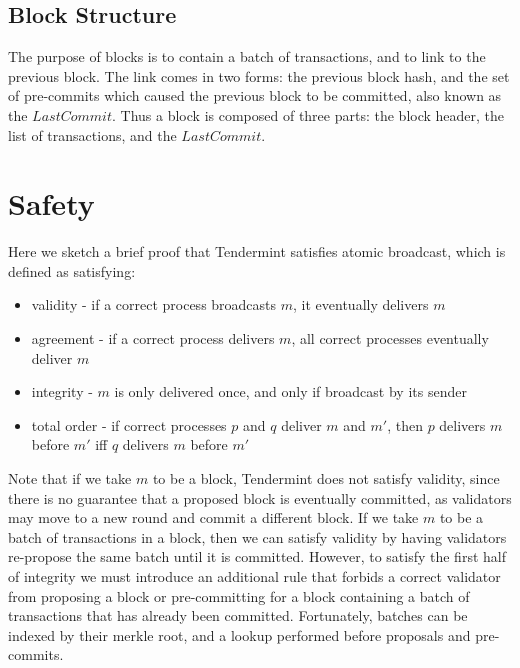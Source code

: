 \subsection{Block Structure}

The purpose of blocks is to contain a batch of transactions, and to link to the previous block.
The link comes in two forms: the previous block hash,
and the set of pre-commits which caused the previous block to be committed, also known as the $LastCommit$.
Thus a block is composed of three parts: the block header, the list of transactions, and the $LastCommit$.

\section{Safety}

Here we sketch a brief proof that Tendermint satisfies atomic broadcast,
which is defined as satisfying:

\begin{itemize}
\item validity - if a correct process broadcasts $m$, it eventually delivers $m$
\item agreement - if a correct process delivers $m$, all correct processes eventually deliver $m$
\item integrity - $m$ is only delivered once, and only if broadcast by its sender
\item total order - if correct processes $p$ and $q$ deliver $m$ and $m'$, then $p$ delivers $m$ before $m'$ iff $q$ delivers $m$ before $m'$
\end{itemize}

Note that if we take $m$ to be a block,
Tendermint does not satisfy validity,
since there is no guarantee that a proposed block is eventually committed, 
as validators may move to a new round and commit a different block.
If we take $m$ to be a batch of transactions in a block, 
then we can satisfy validity by having validators re-propose the same batch until it is committed.
However, to satisfy the first half of integrity 
we must introduce an additional rule that forbids a correct validator from 
proposing a block or pre-committing for a block containing a 
batch of transactions that has already been committed.
Fortunately, batches can be indexed by their merkle root,
and a lookup performed before proposals and pre-commits.

